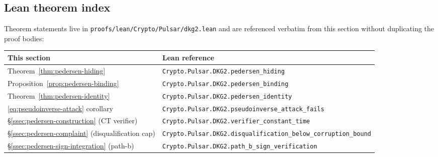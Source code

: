 \subsection{Lean theorem index}
\label{ssec:dkg2-lean}

Theorem statements live in
\texttt{proofs/lean/Crypto/Pulsar/dkg2.lean} and are referenced
verbatim from this section without duplicating the proof bodies:

\begin{tabular}{ll}
\toprule
This section & Lean reference \\
\midrule
Theorem~\ref{thm:pedersen-hiding}      & \texttt{Crypto.Pulsar.DKG2.pedersen\_hiding} \\
Proposition~\ref{prop:pedersen-binding} & \texttt{Crypto.Pulsar.DKG2.pedersen\_binding} \\
Theorem~\ref{thm:pedersen-identity}    & \texttt{Crypto.Pulsar.DKG2.pedersen\_identity} \\
\eqref{eq:pseudoinverse-attack} corollary & \texttt{Crypto.Pulsar.DKG2.pseudoinverse\_attack\_fails} \\
\S\ref{ssec:pedersen-construction} (CT verifier) & \texttt{Crypto.Pulsar.DKG2.verifier\_constant\_time} \\
\S\ref{ssec:pedersen-complaint} (disqualification cap) & \texttt{Crypto.Pulsar.DKG2.disqualification\_below\_corruption\_bound} \\
\S\ref{ssec:pedersen-sign-integration} (path-b) & \texttt{Crypto.Pulsar.DKG2.path\_b\_sign\_verification} \\
\bottomrule
\end{tabular}
